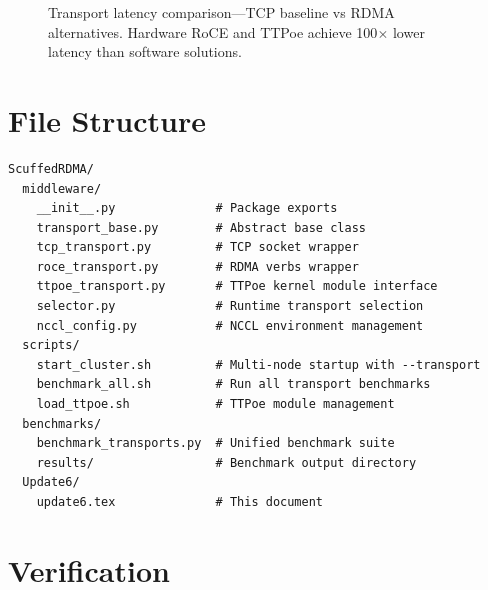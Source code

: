 \documentclass[10pt,letterpaper]{article}
\begin{document}
\begin{figure}[H]
\centering
{}
\caption{Transport latency comparison---TCP baseline vs RDMA alternatives. Hardware RoCE and TTPoe achieve 100$\times$ lower latency than software solutions.}
\end{figure}

\section{File Structure}

\begin{lstlisting}
ScuffedRDMA/
  middleware/
    __init__.py              # Package exports
    transport_base.py        # Abstract base class
    tcp_transport.py         # TCP socket wrapper
    roce_transport.py        # RDMA verbs wrapper
    ttpoe_transport.py       # TTPoe kernel module interface
    selector.py              # Runtime transport selection
    nccl_config.py           # NCCL environment management
  scripts/
    start_cluster.sh         # Multi-node startup with --transport
    benchmark_all.sh         # Run all transport benchmarks
    load_ttpoe.sh            # TTPoe module management
  benchmarks/
    benchmark_transports.py  # Unified benchmark suite
    results/                 # Benchmark output directory
  Update6/
    update6.tex              # This document
\end{lstlisting}

\section{Verification}
\end{document}

